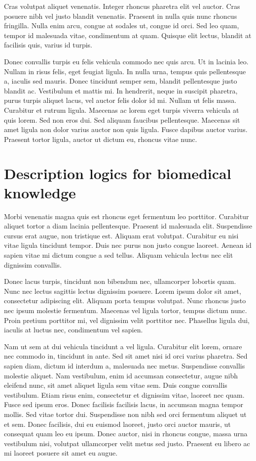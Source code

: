 Cras volutpat aliquet venenatis. Integer rhoncus pharetra elit vel auctor. Cras posuere nibh vel justo blandit venenatis. Praesent in nulla quis nunc rhoncus fringilla. Nulla enim arcu, congue at sodales ut, congue id orci. Sed leo quam, tempor id malesuada vitae, condimentum at quam. Quisque elit lectus, blandit at facilisis quis, varius id turpis.

Donec convallis turpis eu felis vehicula commodo nec quis arcu. Ut in lacinia leo. Nullam in risus felis, eget feugiat ligula. In nulla urna, tempus quis pellentesque a, iaculis sed mauris. Donec tincidunt semper sem, blandit pellentesque justo blandit ac. Vestibulum et mattis mi. In hendrerit, neque in suscipit pharetra, purus turpis aliquet lacus, vel auctor felis dolor id mi. Nullam ut felis massa. Curabitur et rutrum ligula. Maecenas ac lorem eget turpis viverra vehicula at quis lorem. Sed non eros dui. Sed aliquam faucibus pellentesque. Maecenas sit amet ligula non dolor varius auctor non quis ligula. Fusce dapibus auctor varius. Praesent tortor ligula, auctor ut dictum eu, rhoncus vitae nunc.

\section{Description logics for biomedical knowledge}

Morbi venenatis magna quis est rhoncus eget fermentum leo porttitor. Curabitur aliquet tortor a diam lacinia pellentesque. Praesent id malesuada elit. Suspendisse cursus erat augue, non tristique est. Aliquam erat volutpat. Curabitur eu nisi vitae ligula tincidunt tempor. Duis nec purus non justo congue laoreet. Aenean id sapien vitae mi dictum congue a sed tellus. Aliquam vehicula lectus nec elit dignissim convallis.

Donec lacus turpis, tincidunt non bibendum nec, ullamcorper lobortis quam. Nunc nec lectus sagittis lectus dignissim posuere. Lorem ipsum dolor sit amet, consectetur adipiscing elit. Aliquam porta tempus volutpat. Nunc rhoncus justo nec ipsum molestie fermentum. Maecenas vel ligula tortor, tempus dictum nunc. Proin pretium porttitor mi, vel dignissim velit porttitor nec. Phasellus ligula dui, iaculis at luctus nec, condimentum vel sapien.

Nam ut sem at dui vehicula tincidunt a vel ligula. Curabitur elit lorem, ornare nec commodo in, tincidunt in ante. Sed sit amet nisi id orci varius pharetra. Sed sapien diam, dictum id interdum a, malesuada nec metus. Suspendisse convallis molestie aliquet. Nam vestibulum, enim id accumsan consectetur, augue nibh eleifend nunc, sit amet aliquet ligula sem vitae sem. Duis congue convallis vestibulum. Etiam risus enim, consectetur et dignissim vitae, laoreet nec quam. Fusce sed ipsum eros. Donec facilisis facilisis lacus, in accumsan magna tempor mollis. Sed vitae tortor dui. Suspendisse non nibh sed orci fermentum aliquet ut et sem. Donec facilisis, dui eu euismod laoreet, justo orci auctor mauris, ut consequat quam leo eu ipsum. Donec auctor, nisi in rhoncus congue, massa urna vestibulum nisi, volutpat ullamcorper velit metus sed justo. Praesent eu libero ac mi laoreet posuere sit amet eu augue.

